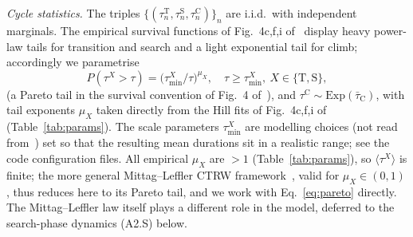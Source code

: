\documentclass[11pt,a4paper]{article}
\begin{document}
\begin{description}
\setlength{\itemsep}{1.2ex}
\item[\textbf{(A1)}] \emph{Cycle statistics.} The triples
$\{(\tau_n^{\mathrm{T}}, \tau_n^{\mathrm{S}}, \tau_n^{\mathrm{C}})\}_n$
are i.i.d.\ with independent marginals. The empirical survival
functions of Fig.~4c,f,i of~\cite{vilpellet2026} display heavy
power-law tails for transition and search and a light exponential
tail for climb; accordingly we parametrise
\begin{equation}
P(\tau^{X}>\tau)=\bigl(\tau_{\min}^{X}/\tau\bigr)^{\mu_X},\quad
\tau\ge\tau_{\min}^{X},\ X\in\{\mathrm{T},\mathrm{S}\},
\label{eq:pareto}
\end{equation}
(a Pareto tail in the survival convention of Fig.~4
of~\cite{vilpellet2026}), and
$\tau^{\mathrm{C}} \sim \mathrm{Exp}(\bar{\tau}_{\mathrm{C}})$,
with tail exponents $\mu_X$ taken directly from the Hill fits of
Fig.~4c,f,i of~\cite{vilpellet2026} (Table~\ref{tab:params}).
The scale parameters $\tau_{\min}^{X}$ are modelling choices (not
read from~\cite{vilpellet2026}) set so that the resulting mean
durations sit in a realistic range; see the code configuration
files. All empirical $\mu_X$ are $>1$ (Table~\ref{tab:params}), so
$\langle\tau^{X}\rangle$ is finite; the more general
Mittag--Leffler CTRW framework~\cite{metzler2000,scalas2004}, valid
for $\mu_X\in(0,1)$, thus reduces here to its Pareto tail, and we
work with Eq.~\eqref{eq:pareto} directly. The Mittag--Leffler law
itself plays a different role in the model, deferred to the
search-phase dynamics (A2.S) below.


\end{description}
\end{document}
